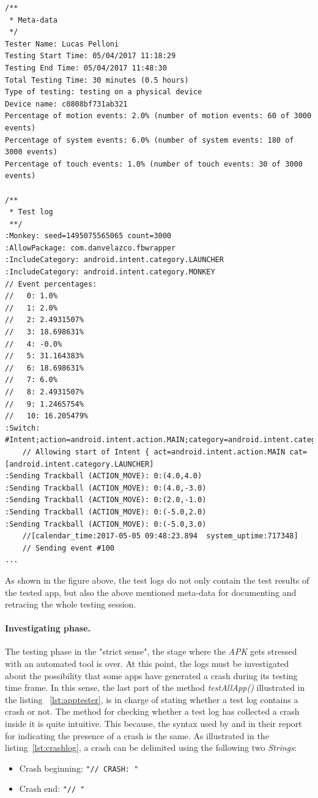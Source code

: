 \begin{lstlisting}[caption=Test log of com.danvelazco.fbwrapper, basicstyle=\fontsize{7}{8}\ttfamily,label={lst:testinglog}]
/**
 * Meta-data
 */
Tester Name: Lucas Pelloni
Testing Start Time: 05/04/2017 11:18:29
Testing End Time: 05/04/2017 11:48:30
Total Testing Time: 30 minutes (0.5 hours)
Type of testing: testing on a physical device
Device name: c0808bf731ab321
Percentage of motion events: 2.0% (number of motion events: 60 of 3000 events)
Percentage of system events: 6.0% (number of system events: 180 of 3000 events)
Percentage of touch events: 1.0% (number of touch events: 30 of 3000 events)

/**
 * Test log 
 **/
:Monkey: seed=1495075565065 count=3000
:AllowPackage: com.danvelazco.fbwrapper
:IncludeCategory: android.intent.category.LAUNCHER
:IncludeCategory: android.intent.category.MONKEY
// Event percentages:
//   0: 1.0%
//   1: 2.0%
//   2: 2.4931507%
//   3: 18.698631%
//   4: -0.0%
//   5: 31.164383%
//   6: 18.698631%
//   7: 6.0%
//   8: 2.4931507%
//   9: 1.2465754%
//   10: 16.205479%
:Switch: #Intent;action=android.intent.action.MAIN;category=android.intent.category.LAUNCHER;end
    // Allowing start of Intent { act=android.intent.action.MAIN cat=[android.intent.category.LAUNCHER]
:Sending Trackball (ACTION_MOVE): 0:(4.0,4.0)
:Sending Trackball (ACTION_MOVE): 0:(4.0,-3.0)
:Sending Trackball (ACTION_MOVE): 0:(2.0,-1.0)
:Sending Trackball (ACTION_MOVE): 0:(-5.0,2.0)
:Sending Trackball (ACTION_MOVE): 0:(-5.0,3.0)
    //[calendar_time:2017-05-05 09:48:23.894  system_uptime:717348]
    // Sending event #100
...
\end{lstlisting}

As shown in the figure above, the test logs do not only contain the test results of the tested app, but also the above mentioned meta-data for documenting and retracing the whole testing session.

\paragraph{Investigating phase. }
The testing phase in the "strict sense", \ie the stage where the \textit{APK} gets stressed with an automated tool is over. At this point, the logs must be investigated about the possibility that some apps have generated a crash during its testing time frame. In this sense, the last part of the method \textit{testAllApp()} illustrated in the listing ~\ref{lst:apptester}, is in charge of stating whether a test log contains a crash or not. The method for checking whether a test log has collected a crash inside it is quite intuitive. This because, the syntax used by \monkey and \sapienz in their report for indicating the presence of a crash is the same. As illustrated in the listing~\ref{lst:crashlog}, a crash can be delimited using the following two \textit{Strings}: 
\begin{itemize}
\item Crash beginning: \texttt{"// CRASH: "}
\item Crash end: \texttt{"// "}
\end{itemize}

